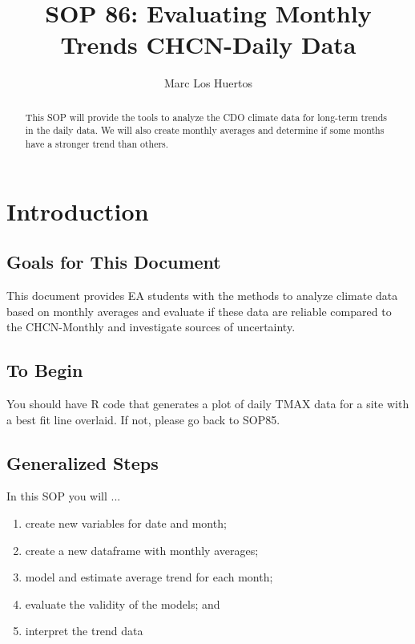 \documentclass{article}\usepackage[]{graphicx}\usepackage[]{color}
\title{SOP 86: Evaluating Monthly Trends CHCN-Daily Data}
\author{Marc Los Huertos}
\begin{document}
\maketitle
\tableofcontents

\begin{abstract}
\noindent This SOP will provide the tools to analyze the CDO climate data for long-term trends in the daily data. We will also create monthly averages and determine if some months have a stronger trend than others.   

\end{abstract}


\section{Introduction}

\subsection{Goals for This Document}

This document provides EA students with the methods to analyze climate data based on monthly averages and evaluate if these data are reliable compared to the CHCN-Monthly and investigate sources of uncertainty. 

\subsection{To Begin}

You should have R code that generates a plot of daily TMAX data for a site with a best fit line overlaid. If not, please go back to SOP85.


\subsection{Generalized Steps}

In this SOP you will ...

\begin{enumerate}
  \item create new variables for date and month;
  \item create a new dataframe with monthly averages;
  \item model and estimate average trend for each month;
  \item evaluate the validity of the models; and
  \item interpret the trend data
\end{enumerate}
\end{document}
